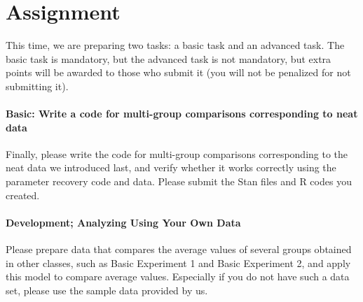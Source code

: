 \documentclass{ltjsbook}
\begin{document}
\section{Assignment}
This time, we are preparing two tasks: a basic task and an advanced task. The basic task is mandatory, but the advanced task is not mandatory, but extra points will be awarded to those who submit it (you will not be penalized for not submitting it).


\paragraph{Basic: Write a code for multi-group comparisons corresponding to neat data} Finally, please write the code for multi-group comparisons corresponding to the neat data we introduced last, and verify whether it works correctly using the parameter recovery code and data. Please submit the Stan files and R codes you created.
\paragraph{Development; Analyzing Using Your Own Data} Please prepare data that compares the average values of several groups obtained in other classes, such as Basic Experiment 1 and Basic Experiment 2, and apply this model to compare average values. Especially if you do not have such a data set, please use the sample data provided by us.
\end{document}

